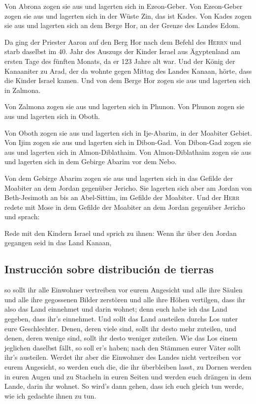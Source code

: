  Von Abrona zogen sie aus und lagerten sich in
Ezeon-Geber.  Von Ezeon-Geber zogen sie aus und lagerten
sich in der Wüste Zin, das ist Kades.  Von Kades zogen
sie aus und lagerten sich an dem Berge Hor, an der Grenze des Landes
Edom.

 Da ging der Priester Aaron auf den Berg Hor nach dem
Befehl des \textsc{Herrn} und starb daselbst im 40. Jahr des Auszugs der
Kinder Israel aus Ägyptenland am ersten Tage des fünften Monats,
 da er 123 Jahre alt war.  Und der König
der Kanaaniter zu Arad, der da wohnte gegen Mittag des Landes Kanaan,
hörte, dass die Kinder Israel kamen.  Und von dem Berge
Hor zogen sie aus und lagerten sich in Zalmona.

 Von Zalmona zogen sie aus und lagerten sich in Phunon.
 Von Phunon zogen sie aus und lagerten sich in Oboth.

 Von Oboth zogen sie aus und lagerten sich in Ije-Abarim,
in der Moabiter Gebiet.  Von Ijim zogen sie aus und
lagerten sich in Dibon-Gad.  Von Dibon-Gad zogen sie aus
und lagerten sich in Almon-Diblathaim.  Von
Almon-Diblathaim zogen sie aus und lagerten sich in dem Gebirge Abarim
vor dem Nebo.

 Von dem Gebirge Abarim zogen sie aus und lagerten sich
in das Gefilde der Moabiter an dem Jordan gegenüber Jericho.
 Sie lagerten sich aber am Jordan von Beth-Jesimoth an
bis an Abel-Sittim, im Gefilde der Moabiter.  Und der
\textsc{Herr} redete mit Mose in dem Gefilde der Moabiter an dem Jordan
gegenüber Jericho und sprach:

 Rede mit den Kindern Israel und sprich zu ihnen: Wenn
ihr über den Jordan gegangen seid in das Land Kanaan,

\hypertarget{instrucciuxf3n-sobre-distribuciuxf3n-de-tierras}{%
\subsection{Instrucción sobre distribución de
tierras}\label{instrucciuxf3n-sobre-distribuciuxf3n-de-tierras}}

 so sollt ihr alle Einwohner vertreiben vor eurem
Angesicht und alle ihre Säulen und alle ihre gegossenen Bilder zerstören
und alle ihre Höhen vertilgen,  dass ihr also das Land
einnehmet und darin wohnet; denn euch habe ich das Land gegeben, dass
ihr's einnehmet.  Und sollt das Land austeilen durchs Los
unter eure Geschlechter. Denen, deren viele sind, sollt ihr desto mehr
zuteilen, und denen, deren wenige sind, sollt ihr desto weniger
zuteilen. Wie das Los einem jeglichen daselbst fällt, so soll er's
haben; nach den Stämmen eurer Väter sollt ihr's austeilen.
 Werdet ihr aber die Einwohner des Landes nicht
vertreiben vor eurem Angesicht, so werden euch die, die ihr überbleiben
lasst, zu Dornen werden in euren Augen und zu Stacheln in euren Seiten
und werden euch drängen in dem Lande, darin ihr wohnet. 
So wird's dann gehen, dass ich euch gleich tun werde, wie ich gedachte
ihnen zu tun.

